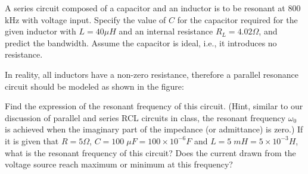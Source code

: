 \item A series circuit composed of a capacitor and an inductor is to be 
resonant at 800 kHz with voltage input. Specify the value of $C$ for the 
capacitor required for the given inductor with $L=40\mu H$ and an internal 
resistance $R_L=4.02\Omega$, and predict the bandwidth. Assume the capacitor 
is ideal, i.e., it introduces no resistance.



\item In reality, all inductors have a non-zero resistance, therefore a 
parallel resonance circuit should be modeled as shown in the figure:


Find the expression of the resonant frequency of this circuit. (Hint,
similar to our discussion of parallel and series RCL circuits in class, 
the resonant frequency $\omega_0$ is achieved when the imaginary part of
the impedance (or admittance) is zero.) If it is given that $R=5\Omega$,
$C=100\;\mu F=100\times 10^{-6}F$ and $L=5\; mH=5\times 10^{-3}H$, what
is the resonant frequency of this circuit? Does the current drawn from 
the voltage source reach maximum or minimum at this frequency?

% 

